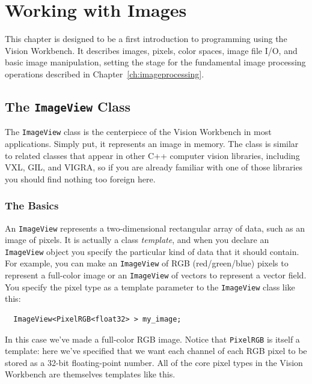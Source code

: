 \chapter{Working with Images}\label{ch:workingwithimages}

This chapter is designed to be a first introduction to programming
using the Vision Workbench.  It describes images, pixels, color
spaces, image file I/O, and basic image manipulation, setting the
stage for the fundamental image processing operations described in
Chapter~\ref{ch:imageprocessing}.

\section{The {\tt ImageView} Class}

The \verb#ImageView# class is the centerpiece of the Vision Workbench
in most applications.  Simply put, it represents an image in memory.
The class is similar to related classes that appear in other C++ computer
vision libraries, including VXL, GIL, and VIGRA, so if you are already
familiar with one of those libraries you should find nothing too
foreign here.

\subsection{The Basics}
An \verb#ImageView# represents a two-dimensional rectangular array of
data, such as an image of pixels.  It is actually a class {\it template},
and when you declare an \verb#ImageView# object you specify the
particular kind of data that it should contain.  For example, you can
make an \verb#ImageView# of RGB (red/green/blue) pixels to represent a
full-color image or an \verb#ImageView# of vectors to represent a vector
field.  You specify the pixel type as a template parameter to the
\verb#ImageView# class like this:
\begin{verbatim}
  ImageView<PixelRGB<float32> > my_image;
\end{verbatim}
In this case we've made a full-color RGB image.  Notice that
\verb#PixelRGB# is itself a template: here we've specified that we
want each channel of each RGB pixel to be stored as a 32-bit
floating-point number.  All of the core pixel types in the Vision
Workbench are themselves templates like this.

